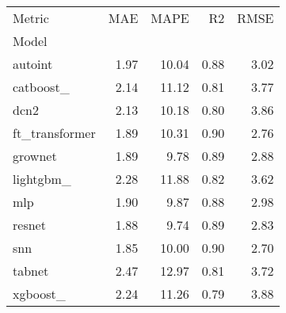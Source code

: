 \begin{tabular}{lrrrr}
\toprule
Metric &  MAE &  MAPE &   R2 &  RMSE \\
Model          &      &       &      &       \\
\midrule
autoint        & 1.97 & 10.04 & 0.88 &  3.02 \\
catboost\_      & 2.14 & 11.12 & 0.81 &  3.77 \\
dcn2           & 2.13 & 10.18 & 0.80 &  3.86 \\
ft\_transformer & 1.89 & 10.31 & 0.90 &  2.76 \\
grownet        & 1.89 &  9.78 & 0.89 &  2.88 \\
lightgbm\_      & 2.28 & 11.88 & 0.82 &  3.62 \\
mlp            & 1.90 &  9.87 & 0.88 &  2.98 \\
resnet         & 1.88 &  9.74 & 0.89 &  2.83 \\
snn            & 1.85 & 10.00 & 0.90 &  2.70 \\
tabnet         & 2.47 & 12.97 & 0.81 &  3.72 \\
xgboost\_       & 2.24 & 11.26 & 0.79 &  3.88 \\
\bottomrule
\end{tabular}
